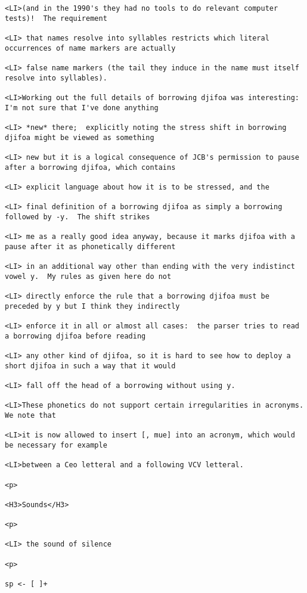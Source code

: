 \documentclass[12pt]{article}
\begin{document}
\begin{lstlisting}
<LI>(and in the 1990's they had no tools to do relevant computer tests)!  The requirement

<LI> that names resolve into syllables restricts which literal occurrences of name markers are actually

<LI> false name markers (the tail they induce in the name must itself resolve into syllables).

<LI>Working out the full details of borrowing djifoa was interesting:  I'm not sure that I've done anything

<LI> *new* there;  explicitly noting the stress shift in borrowing djifoa might be viewed as something

<LI> new but it is a logical consequence of JCB's permission to pause after a borrowing djifoa, which contains

<LI> explicit language about how it is to be stressed, and the

<LI> final definition of a borrowing djifoa as simply a borrowing followed by -y.  The shift strikes

<LI> me as a really good idea anyway, because it marks djifoa with a pause after it as phonetically different

<LI> in an additional way other than ending with the very indistinct vowel y.  My rules as given here do not

<LI> directly enforce the rule that a borrowing djifoa must be preceded by y but I think they indirectly

<LI> enforce it in all or almost all cases:  the parser tries to read a borrowing djifoa before reading

<LI> any other kind of djifoa, so it is hard to see how to deploy a short djifoa in such a way that it would

<LI> fall off the head of a borrowing without using y.

<LI>These phonetics do not support certain irregularities in acronyms.  We note that

<LI>it is now allowed to insert [, mue] into an acronym, which would be necessary for example

<LI>between a Ceo letteral and a following VCV letteral.

<p>

<H3>Sounds</H3>

<p>

<LI> the sound of silence

<p>

sp <- [ ]+


\end{lstlisting}
\end{document}
